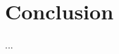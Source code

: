 \documentclass[10pt,twocolumn,letterpaper]{article}
\newcommand{\CITEONE}[2]{\mbox{#1 \cite{#2}}}
\newcommand{\CITETWO}[3]{\mbox{#1 and #2 \cite{#3}}}
\newcommand{\CITEN}[2]{\mbox{#1 et al. \cite{#2}}}
\begin{document}

\section{Conclusion}

...

{\small


}
\end{document}
